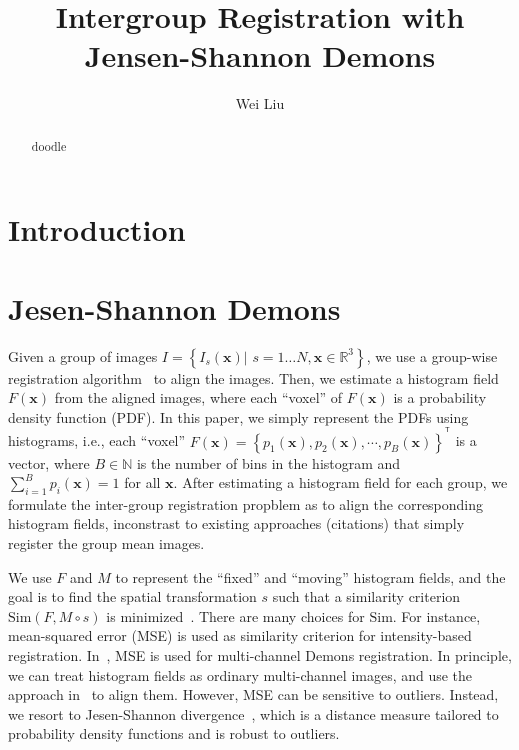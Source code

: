 \documentclass[preprint,review,12pt]{elsarticle}
\newcommand{\ie}{{i.e., }}
\def\Transpose{{^\mathsf{T}}}
\newcommand{\MovingGroup}{M}
\newcommand{\FixedGroup}{F}
\newcommand{\NBin}{B}										%
\newcommand{\bfx}{\mathbf{x}}						%
\newcommand{\SimFunc}{\text{Sim}}
\begin{document}


\begin{frontmatter}



\title{Intergroup Registration with Jensen-Shannon Demons}

\author{Wei Liu}
\address{
}

\begin{abstract}
doodle
\end{abstract}

\begin{keyword}


\end{keyword}

\end{frontmatter}


\section{Introduction}



\section{Jesen-Shannon Demons}

Given a group of images $I=\left\{I_s(\bfx) |\,\, s=1\ldots N, \bfx\in \mathbb{R}^3\right\}$, we use a group-wise registration algorithm~\cite{Wu20111968} to align the images. Then, we estimate a histogram field $\FixedGroup(\bfx)$ from the aligned images, where each ``voxel'' of $\FixedGroup(\bfx)$ is a probability density function (PDF). In this paper, we simply represent the PDFs using histograms, \ie each ``voxel'' $\FixedGroup(\bfx) = \left\{ p_1(\bfx), p_2(\bfx), \cdots, p_\NBin(\bfx) \right\}^\Transpose$ is a vector, where $\NBin \in \mathbb{N}$ is the number of bins in the histogram and $\sum_{i=1}^\NBin p_i(\bfx)=1$ for all $\bfx$. After estimating a histogram field for each group, we formulate the inter-group registration propblem as to align the corresponding histogram fields, inconstrast to existing approaches (citations) that simply register the group mean images.

We use $\FixedGroup$ and $\MovingGroup$ to represent the ``fixed'' and ``moving'' histogram fields, and the goal is to find the spatial transformation $s$ such that a similarity criterion $\SimFunc(\FixedGroup,\MovingGroup\circ s)$ is minimized~\cite{Vercauteren2009S61}. There are many choices for $\SimFunc$. For instance, mean-squared error (MSE) is used as similarity criterion for intensity-based registration. In~\cite{peyrat_multichannel_demons}, MSE is used for multi-channel Demons registration. In principle, we can treat histogram fields as ordinary multi-channel images, and use the approach in~\cite{peyrat_multichannel_demons} to align them. However, MSE can be sensitive to outliers. Instead, we resort to Jesen-Shannon divergence~\cite{wang_vemuri_js_divergence}, which is a distance measure tailored to probability density functions and is robust to outliers.
\end{document}
